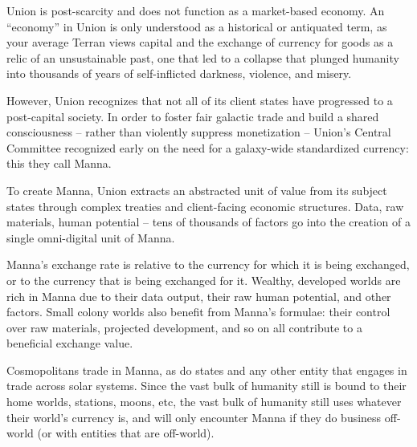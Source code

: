 Union is post-scarcity and does not function as a market-based economy. An “economy” in
Union is only understood as a historical or antiquated term, as your average Terran views capital
and the exchange of currency for goods as a relic of an unsustainable past, one that led to a
collapse that plunged humanity into thousands of years of self-inflicted darkness, violence, and
misery.


However, Union recognizes that not all of its client states have progressed to a post-capital
society. In order to foster fair galactic trade and build a shared consciousness  -- rather than
violently suppress monetization --  Union’s Central Committee recognized early on the need for a
galaxy-wide standardized currency: this they call Manna.


To create Manna, Union extracts an abstracted unit of value from its subject states through
complex treaties and client-facing economic structures. Data, raw materials, human potential --
tens of thousands of factors go into the creation of a single omni-digital unit of Manna.


Manna’s exchange rate is relative to the currency for which it is being exchanged, or to the
currency that is being exchanged for it. Wealthy, developed worlds are rich in Manna due to their
data output, their raw human potential, and other factors. Small colony worlds also benefit from
Manna’s formulae: their control over raw materials, projected development, and so on all
contribute to a beneficial exchange value.


Cosmopolitans trade in Manna, as do states and any other entity that engages in trade across
solar systems. Since the vast bulk of humanity still is bound to their home worlds, stations,
moons, etc, the vast bulk of humanity still uses whatever their world’s currency is, and will only
encounter Manna if they do business off-world (or with entities that are off-world).
